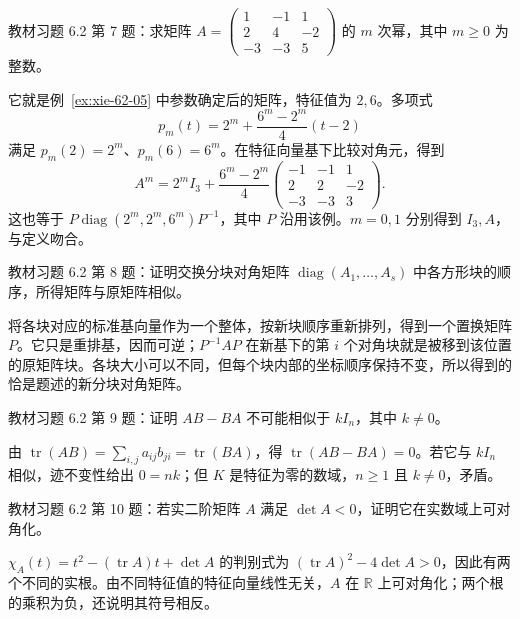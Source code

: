 \begin{example}
\label{ex:xie-62-07}
教材习题 6.2 第 7 题：求矩阵 $A=\begin{pmatrix}1&-1&1\\2&4&-2\\-3&-3&5\end{pmatrix}$ 的 $m$ 次幂，其中 $m\geq0$ 为整数。
\end{example}
\begin{solve}
它就是例~\ref{ex:xie-62-05} 中参数确定后的矩阵，特征值为 $2,6$。多项式
\[
 p_m(t)=2^m+\frac{6^m-2^m}{4}(t-2)
\]
满足 $p_m(2)=2^m$、$p_m(6)=6^m$。在特征向量基下比较对角元，得到
\begin{equation}
\label{eq:xie-exercise-matrix-power}
 A^m=2^mI_3+\frac{6^m-2^m}{4}
 \begin{pmatrix}-1&-1&1\\2&2&-2\\-3&-3&3\end{pmatrix}.
\end{equation}
这也等于 $P\operatorname{diag}(2^m,2^m,6^m)P^{-1}$，其中 $P$ 沿用该例。$m=0,1$ 分别得到 $I_3,A$，与定义吻合。
\end{solve}

\begin{example}
\label{ex:xie-62-08}
教材习题 6.2 第 8 题：证明交换分块对角矩阵 $\operatorname{diag}(A_1,\ldots,A_s)$ 中各方形块的顺序，所得矩阵与原矩阵相似。
\end{example}
\begin{solve}
将各块对应的标准基向量作为一个整体，按新块顺序重新排列，得到一个置换矩阵 $P$。它只是重排基，因而可逆；$P^{-1}AP$ 在新基下的第 $i$ 个对角块就是被移到该位置的原矩阵块。各块大小可以不同，但每个块内部的坐标顺序保持不变，所以得到的恰是题述的新分块对角矩阵。
\end{solve}

\begin{example}
\label{ex:xie-62-09}
教材习题 6.2 第 9 题：证明 $AB-BA$ 不可能相似于 $kI_n$，其中 $k\ne0$。
\end{example}
\begin{solve}
由 $\operatorname{tr}(AB)=\sum_{i,j}a_{ij}b_{ji}=\operatorname{tr}(BA)$，得 $\operatorname{tr}(AB-BA)=0$。若它与 $kI_n$ 相似，迹不变性给出 $0=nk$；但 $K$ 是特征为零的数域，$n\geq1$ 且 $k\ne0$，矛盾。
\end{solve}

\begin{example}
\label{ex:xie-62-10}
教材习题 6.2 第 10 题：若实二阶矩阵 $A$ 满足 $\det A<0$，证明它在实数域上可对角化。
\end{example}
\begin{solve}
$\chi_A(t)=t^2-(\operatorname{tr}A)t+\det A$ 的判别式为 $(\operatorname{tr}A)^2-4\det A>0$，因此有两个不同的实根。由不同特征值的特征向量线性无关，$A$ 在 $\mathbb R$ 上可对角化；两个根的乘积为负，还说明其符号相反。
\end{solve}

